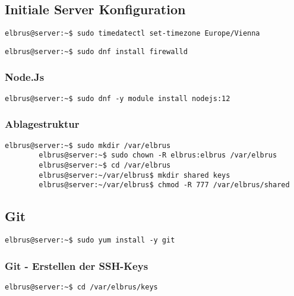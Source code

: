 \documentclass{article}
\begin{document}
	\subsection{Initiale Server Konfiguration}

	\begin{lstlisting}[caption={Setzen der Zeitzone auf 'Europa/Wien'.}]
		elbrus@server:~$ sudo timedatectl set-timezone Europe/Vienna
	\end{lstlisting}

	\begin{lstlisting}[caption={Installieren von dem 'firewalld' Service.}]
		elbrus@server:~$ sudo dnf install firewalld
	\end{lstlisting}
	
	\subsubsection{Node.Js}
	\begin{lstlisting}[caption={Installieren des Framworks 'Node.Js'.}]
		elbrus@server:~$ sudo dnf -y module install nodejs:12
	\end{lstlisting}
	
	\subsubsection{Ablagestruktur}
	\lstset{style=commands}
	\begin{lstlisting}[caption={Anlegen der Verzeichnissstruktur.}]
		elbrus@server:~$ sudo mkdir /var/elbrus
		elbrus@server:~$ sudo chown -R elbrus:elbrus /var/elbrus
		elbrus@server:~$ cd /var/elbrus
		elbrus@server:~/var/elbrus$ mkdir shared keys
		elbrus@server:~/var/elbrus$ chmod -R 777 /var/elbrus/shared
	\end{lstlisting}

	\newpage
	\lstset{style=commands}
	\subsection{Git}
	\begin{lstlisting}[caption={Installieren von dem VCS 'git'.}]
		elbrus@server:~$ sudo yum install -y git
	\end{lstlisting}
	\subsubsection{Git - Erstellen der SSH-Keys}
	\begin{lstlisting}[caption={Wechseln des Verzeichnisses.}]
		elbrus@server:~$ cd /var/elbrus/keys
	\end{lstlisting}
	
\end{document}
